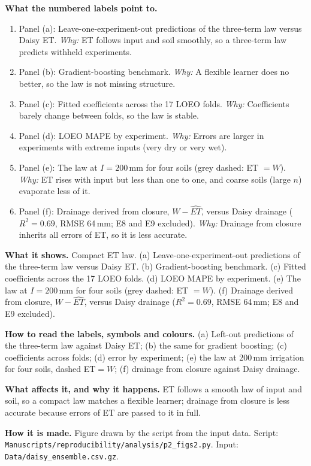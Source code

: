 \textbf{What the numbered labels point to.}
\begin{enumerate}[nosep,label=\protect\circled{\arabic*}]
\item Panel (a): Leave-one-experiment-out predictions of the three-term law versus Daisy ET. \emph{Why:} ET follows input and soil smoothly, so a three-term law predicts withheld experiments.
\item Panel (b): Gradient-boosting benchmark. \emph{Why:} A flexible learner does no better, so the law is not missing structure.
\item Panel (c): Fitted coefficients across the 17 LOEO folds. \emph{Why:} Coefficients barely change between folds, so the law is stable.
\item Panel (d): LOEO MAPE by experiment. \emph{Why:} Errors are larger in experiments with extreme inputs (very dry or very wet).
\item Panel (e): The law at $I=200$\,mm for four soils (grey dashed: ET $=W$). \emph{Why:} ET rises with input but less than one to one, and coarse soils (large $n$) evaporate less of it.
\item Panel (f): Drainage derived from closure, $W-\widehat{\mathit{ET}}$, versus Daisy drainage ($R^2=0.69$, RMSE 64\,mm; E8 and E9 excluded). \emph{Why:} Drainage from closure inherits all errors of ET, so it is less accurate.
\end{enumerate}

\textbf{What it shows.} Compact ET law. (a) Leave-one-experiment-out predictions of the three-term law versus Daisy ET. (b) Gradient-boosting benchmark. (c) Fitted coefficients across the 17 LOEO folds. (d) LOEO MAPE by experiment. (e) The law at $I=200$\,mm for four soils (grey dashed: ET $=W$). (f) Drainage derived from closure, $W-\widehat{\mathit{ET}}$, versus Daisy drainage ($R^2=0.69$, RMSE 64\,mm; E8 and E9 excluded).

\textbf{How to read the labels, symbols and colours.} (a) Left-out predictions of the three-term law against Daisy ET; (b) the same for gradient boosting; (c) coefficients across folds; (d) error by experiment; (e) the law at 200\,mm irrigation for four soils, dashed ET$=W$; (f) drainage from closure against Daisy drainage.

\textbf{What affects it, and why it happens.} ET follows a smooth law of input and soil, so a compact law matches a flexible learner; drainage from closure is less accurate because errors of ET are passed to it in full.

\textbf{How it is made.} Figure drawn by the script from the input data. Script: \nolinkurl{Manuscripts/reproducibility/analysis/p2_figs2.py}. Input: \nolinkurl{Data/daisy_ensemble.csv.gz}.

